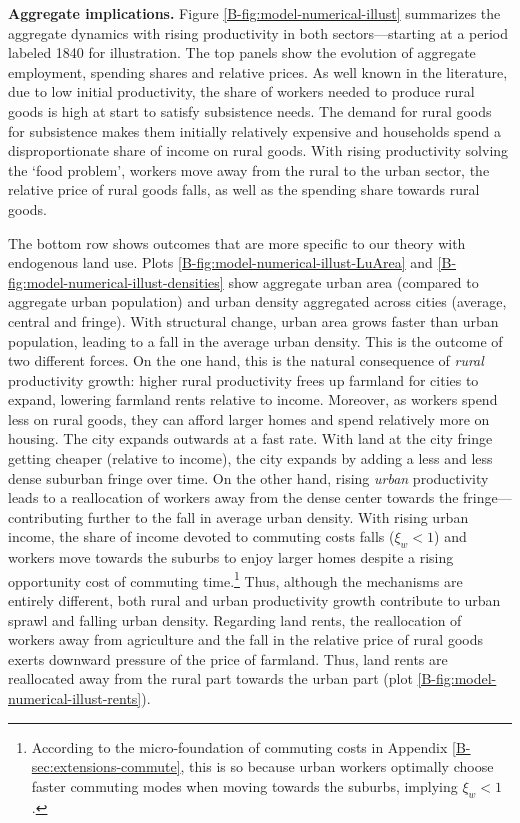 \documentclass[11pt]{report}
\begin{document}
\textbf{Aggregate implications.} Figure \ref{B-fig:model-numerical-illust} summarizes the aggregate dynamics with rising productivity in both sectors---starting at a period labeled 1840 for illustration. The top panels show the evolution of aggregate employment, spending shares and relative prices. As well known in the literature, due to low initial productivity, the share of workers needed to produce rural goods is high at start to satisfy subsistence needs. The demand for rural goods for subsistence makes them initially relatively expensive and households spend a disproportionate share of income on rural goods. With rising productivity solving the `food problem', workers move away from the rural to the urban sector, the relative price of rural goods falls, as well as the spending share towards rural goods. 

The bottom row shows outcomes that are more specific to our theory with endogenous land use. Plots \ref{B-fig:model-numerical-illust-LuArea} and \ref{B-fig:model-numerical-illust-densities} show aggregate urban area (compared to aggregate urban population) and urban density aggregated across cities (average, central and fringe). With structural change, urban area grows faster than urban population, leading to a fall in the average urban density. This is the outcome of two different forces. On the one hand, this is the natural consequence of \textit{rural} productivity growth: higher rural productivity frees up farmland for cities to expand, lowering farmland rents relative to income. Moreover, as workers spend less on rural goods, they can afford larger homes and spend relatively more on housing. The city expands outwards at a fast rate. With land at the city fringe getting cheaper (relative to income), the city expands by adding a less and less dense suburban fringe over time. On the other hand, rising \textit{urban} productivity leads to a reallocation of workers away from the dense center towards the fringe---contributing further to the fall in average urban density. With rising urban income, the share of income devoted to commuting costs falls ($\xi_w<1$) and workers move towards the suburbs to enjoy larger homes despite a rising opportunity cost of commuting time.\footnote{According to the micro-foundation of commuting costs in Appendix \ref{B-sec:extensions-commute}, this is so because urban workers optimally choose faster commuting modes when moving towards the suburbs, implying $\xi_w<1$.} Thus, although the mechanisms are entirely different, both rural and urban productivity growth contribute to urban sprawl and falling urban density.
Regarding land rents, the reallocation of workers away from agriculture and the fall in the relative price of rural goods exerts downward pressure of the price of farmland. Thus, land rents are reallocated away from the rural part towards the urban part (plot \ref{B-fig:model-numerical-illust-rents}). 
\end{document}
